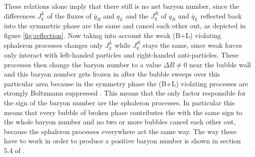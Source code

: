 These relations alone imply that there still is no net baryon number, since the differences $J^L_q$ of the fluxes of $\bar{q}_R$ and $q_L$ and the  $J^R_q$ of $q_R$ and $\bar{q}_L$ reflected back into the symmetric phase are the same and cancel each other out, as depicted in figure \ref{fig:reflection}. Now taking into account the weak (B+L) violating sphaleron processes changes only $J^L_q$ while  $J^R_q$ stays the same, since weak forces only interact with left-handed particles and right-handed anti-particles. These processes then change the baryon number to a value $\Delta B\neq$0 near the bubble wall and this baryon number gets frozen in after the bubble sweeps over this particular area because in the symmetry phase the (B+L) violating processes are strongly Boltzmann suppressed \cite{Bernreuther:2002uj}. This means that the only factor responsible for the sign of the baryon number are the sphaleron processes. In particular this means that every bubble of broken phase contributes the with the same sign to the whole baryon number and no two or more bubbles cancel each other out, because the sphaleron processes everywhere act the same way. The way these have to work in order to produce a positive baryon number is shown in section 5.4 of \cite{Bernreuther:2002uj}.
